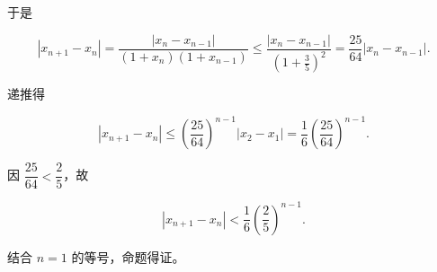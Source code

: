 \begin{answer}
于是

\nopagebreak[4]
\[|x_{n+1}-x_n|
=\frac{|x_n-x_{n-1}|}{(1+x_n)(1+x_{n-1})}
\leqslant\frac{|x_n-x_{n-1}|}{\left(1+\frac35\right)^2}
=\frac{25}{64}|x_n-x_{n-1}|.\]

递推得

\nopagebreak[4]
\[|x_{n+1}-x_n|
\leqslant\left(\frac{25}{64}\right)^{n-1}|x_2-x_1|
=\frac16\left(\frac{25}{64}\right)^{n-1}.\]

因 $\dfrac{25}{64}<\dfrac25$，故

\nopagebreak[4]
\[|x_{n+1}-x_n|<\frac16\left(\frac25\right)^{n-1}.\]

结合 $n=1$ 的等号，命题得证。


\end{answer}
